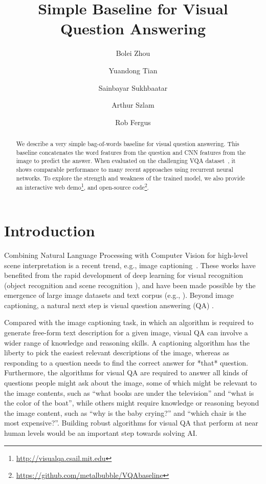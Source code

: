 \documentclass{article} \usepackage{nips14submit_e,times}
\title{Simple Baseline for Visual Question Answering}
\author[1]{Bolei Zhou}
\author[2]{Yuandong Tian}
\author[2]{Sainbayar Sukhbaatar}
\author[2]{Arthur Szlam}
\author[2]{Rob Fergus}
\affil[1]{Massachusetts Institute of Technology}
\affil[2]{Facebook AI Research}
\begin{document}
\maketitle

\begin{abstract}
We describe a very simple bag-of-words baseline for visual question answering. This baseline concatenates the word features from the question and CNN features from the image to predict the answer. When evaluated on the challenging VQA dataset~\cite{antol2015vqa}, it shows comparable performance to many recent approaches using recurrent neural networks. To explore the strength and weakness of the trained model, we also provide an interactive web demo\footnote{\url{http://visualqa.csail.mit.edu}}, and open-source  code\footnote{\url{https://github.com/metalbubble/VQAbaseline}}.
\end{abstract}

\section{Introduction}
Combining Natural Language Processing with Computer Vision for high-level scene interpretation is a recent trend, e.g., image captioning~\cite{mao2014deep,vinyals2014show,kiros2014multimodal,devlin2015exploring}. These works have
benefited from the rapid development of deep learning for visual recognition (object recognition \cite{krizhevsky2012imagenet} and scene recognition \cite{zhou2014learning}), and have been made possible by the emergence of large image datasets and text corpus (e.g., \cite{lin2014microsoft}). Beyond image captioning, a natural next step is visual question answering (QA) \cite{ren2015exploring,antol2015vqa,gao2015you}. 





Compared with the image captioning task, in which an algorithm is required to generate free-form text description for a given image, visual QA can involve a wider range of knowledge and reasoning skills. A captioning algorithm has the liberty to pick the easiest relevant descriptions of the image, whereas as responding to a question needs to find the correct answer for *that* question.   Furthermore, the algorithms for visual QA are required to answer all kinds of questions people might ask about the image, some of which might be relevant to the image contents, such as ``what books are under the television'' and ``what is the color of the boat'', while others might require knowledge or reasoning beyond the image content, such as ``why is the baby crying?'' and ``which chair is the most expensive?''.   Building robust algorithms for visual QA that perform at near human levels would be an important step towards solving AI. 
\end{document}

